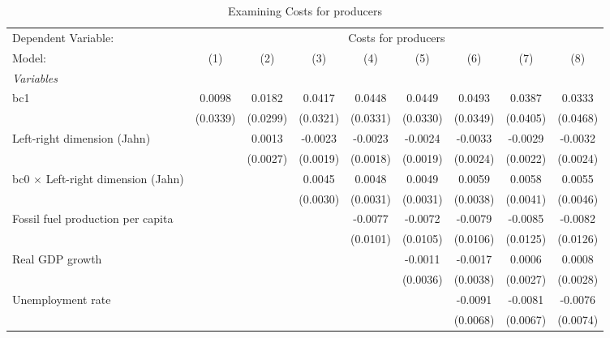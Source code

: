 
\begin{table}[htbp]
   \caption{Examining Costs for producers}
   \centering
   \begin{tabular}{lcccccccc}
      \tabularnewline \midrule \midrule
      Dependent Variable: & \multicolumn{8}{c}{Costs for producers}\\
      Model:                                    & (1)      & (2)      & (3)      & (4)      & (5)      & (6)      & (7)      & (8)\\  
      \midrule
      \emph{Variables}\\
      bc1                                       & 0.0098   & 0.0182   & 0.0417   & 0.0448   & 0.0449   & 0.0493   & 0.0387   & 0.0333\\   
                                                & (0.0339) & (0.0299) & (0.0321) & (0.0331) & (0.0330) & (0.0349) & (0.0405) & (0.0468)\\   
      Left-right dimension (Jahn)               &          & 0.0013   & -0.0023  & -0.0023  & -0.0024  & -0.0033  & -0.0029  & -0.0032\\   
                                                &          & (0.0027) & (0.0019) & (0.0018) & (0.0019) & (0.0024) & (0.0022) & (0.0024)\\   
      bc0 $\times$ Left-right dimension (Jahn)  &          &          & 0.0045   & 0.0048   & 0.0049   & 0.0059   & 0.0058   & 0.0055\\   
                                                &          &          & (0.0030) & (0.0031) & (0.0031) & (0.0038) & (0.0041) & (0.0046)\\   
      Fossil fuel production per capita         &          &          &          & -0.0077  & -0.0072  & -0.0079  & -0.0085  & -0.0082\\   
                                                &          &          &          & (0.0101) & (0.0105) & (0.0106) & (0.0125) & (0.0126)\\   
      Real GDP growth                           &          &          &          &          & -0.0011  & -0.0017  & 0.0006   & 0.0008\\   
                                                &          &          &          &          & (0.0036) & (0.0038) & (0.0027) & (0.0028)\\   
      Unemployment rate                         &          &          &          &          &          & -0.0091  & -0.0081  & -0.0076\\   
                                                &          &          &          &          &          & (0.0068) & (0.0067) & (0.0074)\\   

\end{tabular}
\end{table}
